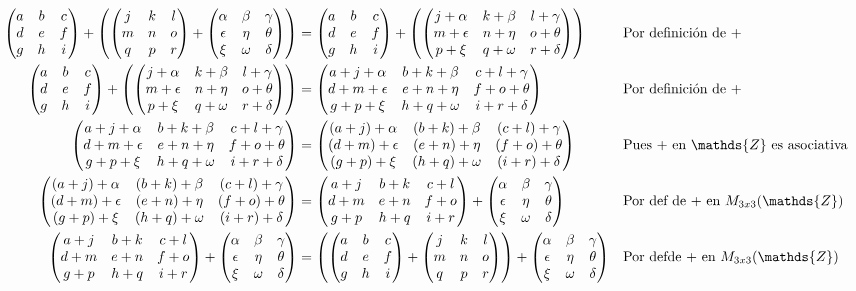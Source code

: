 \documentclass[letterpaper]{article}
\newcommand{\Nmat}{\begin{pmatrix}
		j & k & l\\
		m & n & o\\
		q & p & r\\
\end{pmatrix}}
\newcommand{\Pmat}{\begin{pmatrix}
		\alpha & \beta & \gamma\\
		\epsilon & \eta & \theta\\
		\xi & \omega & \delta
\end{pmatrix}}
\newcommand{\Mmat}{\begin{pmatrix}
		a & b & c\\
		d & e & f\\
		g & h & i
\end{pmatrix}}
\newcommand{\mtt}{M_{3x3}(\mathds{Z})}
\newcommand{\Z}{\mathds{Z}}
\renewcommand{\*}{\cdot}
\theoremstyle{definition}
\begin{document}
\begin{align*}
	\Mmat + \left(\Nmat + \Pmat \right) & = \Mmat + \left(\begin{pmatrix}
		j + \alpha & k + \beta & l + \gamma \\
		m + \epsilon & n + \eta & o + \theta \\
		p + \xi & q + \omega & r + \delta 
	\end{pmatrix} \right) && \text{Por definición de $ + $}\\
	\Mmat + \left(\begin{pmatrix}
	j + \alpha & k + \beta & l + \gamma \\
	m + \epsilon & n + \eta & o + \theta \\
	p + \xi & q + \omega & r + \delta 
	\end{pmatrix} \right) & = \begin{pmatrix}
	a + j + \alpha & b+k + \beta &c+ l + \gamma \\
	d+m + \epsilon & e+n + \eta & f+o + \theta \\
	g+p + \xi & h+q + \omega & i+r + \delta 
	\end{pmatrix} && \text{Por definición de +}\\
	\begin{pmatrix}
	a + j + \alpha & b+k + \beta &c+ l + \gamma \\
	d+m + \epsilon & e+n + \eta & f+o + \theta \\
	g+p + \xi & h+q + \omega & i+r + \delta 
	\end{pmatrix} &= \begin{pmatrix}
	(a + j) + \alpha & (b+k) + \beta & (c+ l) + \gamma \\
	(d+m) + \epsilon & (e+n) + \eta & (f+o) + \theta \\
	(g+p) + \xi & (h+q) + \omega & (i+r) + \delta 
	\end{pmatrix} &&\text{Pues + en $ \Z $ es asociativa}\\
	\begin{pmatrix}
	(a + j) + \alpha & (b+k) + \beta & (c+ l) + \gamma \\
	(d+m) + \epsilon & (e+n) + \eta & (f+o) + \theta \\
	(g+p) + \xi & (h+q) + \omega & (i+r) + \delta 
	\end{pmatrix} &= \begin{pmatrix}
	a + j & b+k & c+ l\\
	d+m & e+n & f+o\\
	g+p & h+q & i+r 
	\end{pmatrix} + \Pmat &&\text{Por def de $ + $ en $ \mtt $}\\
	\begin{pmatrix}
	a + j & b+k & c+ l\\
	d+m & e+n & f+o\\
	g+p & h+q & i+r 
	\end{pmatrix} + \Pmat & = \left(\Mmat + \Nmat \right) + \Pmat &&\text{Por defde $ + $ en $ \mtt $}
\end{align*}
\end{document}
